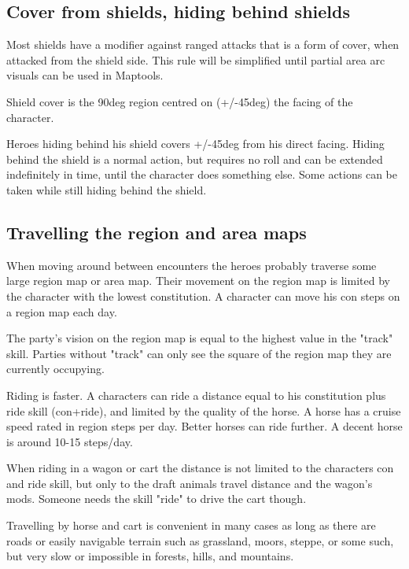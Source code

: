 \subsection*{Cover from shields, hiding behind shields}
Most shields have a modifier against ranged attacks that is a form of cover, when attacked from the shield side. This rule will be simplified until partial area arc visuals can be used in Maptools.

Shield cover is the 90deg region centred on (+/-45deg) the facing of the character.

Heroes hiding behind his shield covers +/-45deg from his direct facing. Hiding behind the shield is a normal action, but requires no roll and can be extended indefinitely in time, until the character does something else. Some actions can be taken while still hiding behind the shield.


\subsection*{Travelling the region and area maps}
When moving around between encounters the heroes probably traverse some large region map or area map. Their movement on the region map is limited by the character with the lowest constitution. A character can move his con steps on a region map each day.

The party's vision on the region map is equal to the highest value in the "track" skill. Parties without "track" can only see the square of the region map they are currently occupying.

Riding is faster. A characters can ride a distance equal to his constitution plus ride skill (con+ride), and limited by the quality of the horse. A horse has a cruise speed rated in region steps per day. Better horses can ride further. A decent horse is around 10-15 steps/day.

When riding in a wagon or cart the distance is not limited to the characters con and ride skill, but only to the draft animals travel distance and the wagon's mods. Someone needs the skill "ride" to drive the cart though.

Travelling by horse and cart is convenient in many cases as long as there are roads or easily navigable terrain such as grassland, moors, steppe, or some such, but very slow or impossible in forests, hills, and mountains.

